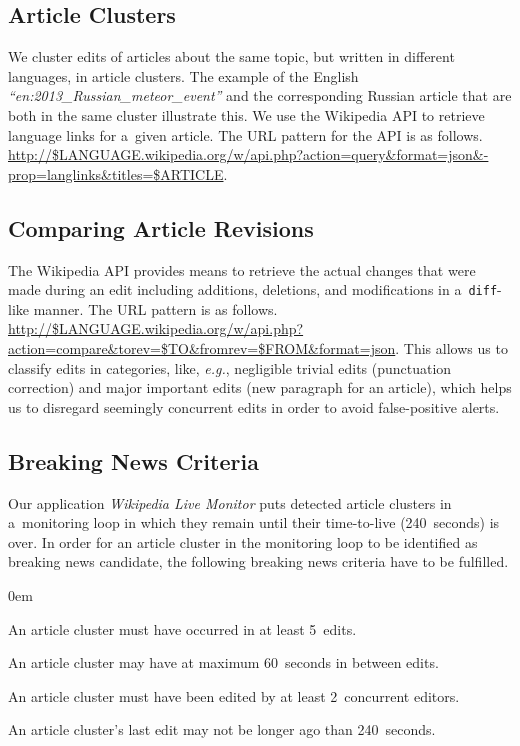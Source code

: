 \subsection{Article Clusters}

We cluster edits of articles about the same topic,
but written in different languages, in article clusters.
The example of the English
\emph{``en:2013\_Russian\_meteor\_event''}
and the corresponding Russian article
that are both in the same cluster illustrate this.
We use the Wikipedia API to retrieve language links for a~given article.
The URL pattern for the API is as follows.
\url{http://$LANGUAGE.wikipedia.org/w/api.php?action=query&format=json&-prop=langlinks&titles=$ARTICLE}.

\subsection{Comparing Article Revisions}
\label{sec:comparing-article-revisions}

The Wikipedia API provides means to retrieve the actual changes
that were made during an edit including additions, deletions,
and modifications in a~\texttt{diff}-like manner.
The URL pattern is as follows.
\url{http://$LANGUAGE.wikipedia.org/w/api.php?action=compare&torev=$TO&fromrev=$FROM&format=json}. %
This allows us to classify edits in categories, like, \emph{e.g.},
negligible trivial edits (punctuation correction) and 
major important edits (new paragraph for an article),
which helps us to disregard seemingly concurrent edits
in order to avoid false-positive alerts.

\subsection{Breaking News Criteria}

Our application \emph{Wikipedia Live Monitor} puts  
detected article clusters in a~monitoring loop in which they remain
until their time-to-live (240~seconds) is over.
In order for an article cluster in the monitoring loop
to be identified as breaking news candidate,
the following breaking news criteria have to be fulfilled.

\begin{description}
  \itemsep0em
  \item[$\geq$~5~Occurrences:] An article cluster must have occurred
  in at least 5~edits.
  \item[$\leq$~60~Seconds Between Edits:] An article cluster may have
  at maximum 60~seconds in between edits.
  \item[$\geq$~2~Concurrent Editors:] An article cluster must have been edited
  by at least 2~concurrent editors.
  \item[$\leq$~240~Seconds Since Last Edit:] An article cluster's last edit
  may not be longer ago than 240~seconds.
\end{description}

